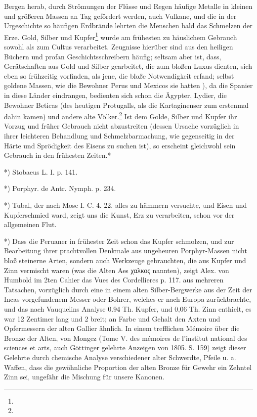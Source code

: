 \documentclass[a4paper, 11pt, oneside, polutonikogreek, german]{article}
\begin{document}
Bergen herab, durch Strömungen der Flüsse und Regen häufige Metalle in kleinen und größeren Massen an Tag gefördert werden, auch Vulkane, und die in der Urgeschichte so häufigen Erdbrände lehrten die Menschen bald das Schmelzen der Erze. Gold, Silber und Kupfer\footnote{} wurde am frühesten zu häuslichem Gebrauch sowohl als zum Cultus verarbeitet. Zeugnisse hierüber sind aus den heiligen Büchern und profan Geschichtsschreibern häufig; seltsam aber ist, dass, Gerätschaften aus Gold und Silber gearbeitet, die zum bloßen Luxus dienten, sich eben so frühzeitig vorfinden, als jene, die bloße Notwendigkeit erfand; selbst goldene Massen, wie die Bewohner Perus und Mexicos sie hatten ), da die Spanier in diese Länder eindrangen, bedienten sich schon die Ägypter, Lydier, die Bewohner Beticas (des heutigen Protugalls, als die Kartaginenser zum erstenmal dahin kamen) und andere alte Völker.\footnote{} Ist dem Golde, Silber und Kupfer ihr Vorzug und früher Gebrauch nicht abzustreiten (dessen Ursache vorzüglich in ihrer leichteren Behandlung und Schmelzbarmachung, wie gegenseitig in der Härte und Sprödigkeit des Eisens zu suchen ist), so erscheint gleichwohl sein Gebrauch in den frühesten Zeiten.*

*) Stobaeus L. I. p. 141.

*) Porphyr. de Antr. Nymph. p. 234.

*) Tubal, der nach Mose I. C. 4. 22. alles zu hämmern versuchte, und Eisen und Kupferschmied ward, zeigt uns die Kunst, Erz zu verarbeiten, schon vor der allgemeinen Flut.

*) Dass die Peruaner in frühester Zeit schon das Kupfer schmolzen, und zur Bearbeitung ihrer prachtvollen Denkmale aus ungeheuren Porphyr-Massen nicht bloß steinerne Arten, sondern auch Werkzeuge gebrauchten, die aus Kupfer und Zinn vermischt waren (was die Alten Aes χαλκος nannten), zeigt Alex. von Humbold im 2ten Cahier das Vues des Cordellieres p. 117. aus mehreren Tatsachen, vorzüglich durch eine in einem alten Silber-Bergwerke aus der Zeit der Incas vorgefundenem Messer oder Bohrer, welches er nach Europa zurückbrachte, und das nach Vauquelins Analyse 0.94 Th. Kupfer, und 0,06 Th. Zinn enthielt, es war 12 Zentimer lang und 2 breit; an Farbe und Gehalt den Axten und Opfermessern der alten Gallier ähnlich. In einem trefflichen Mémoire über die Bronze der Alten, von Mongez (Tome V. des mémoires de l'institut national des sciences et arts, auch Göttinger gelehrte Anzeigen von 1805. S. 159) zeigt dieser Gelehrte durch chemische Analyse verschiedener alter Schwerdte, Pfeile u. a. Waffen, dass die gewöhnliche Proportion der alten Bronze für Gewehr ein Zehntel Zinn sei, ungefähr die Mischung für unsere Kanonen.
\end{document}
